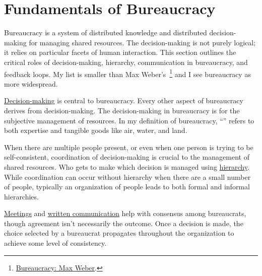 \section{Fundamentals of Bureaucracy\label{sec:fundamentals-of-b}}
  
Bureaucracy is a system of distributed knowledge and distributed decision-making for managing shared resources. The decision-making is not purely logical; it relies on particular facets of human interaction. This section outlines the critical roles of decision-making, hierarchy, communication in bureaucracy, and feedback loops. 
My list is smaller than Max Weber's~\cite{2015_Weber}\footnote{\href{https://en.wikipedia.org/wiki/Bureaucracy\#Max_Weber}{Bureaucracy: Max Weber}.
} and I see bureaucracy as more widespread.

\hyperref[sec:decision-making]{Decision-making}
is central to bureaucracy. Every other aspect of bureaucracy derives from decision-making. The decision-making in bureaucracy is for the subjective management of resources. In my definition of bureaucracy, ``\iftoggle{glossarysubstitutionworks}{\glspl{shared resource}}{shared resources}'' 
\iftoggle{glossaryinmargin}{\marginpar{[Glossary]}}{} refers to both expertise and tangible goods like air, water, and land. 

When there are multiple people present, or even when one person is trying to be self-consistent, coordination of decision-making is crucial to the management of shared resources. Who gets to make which decision is managed using
\hyperref[sec:hierarchy-of-roles]{hierarchy}.
While coordination can occur without hierarchy when there are a small number of people, typically an organization of people leads to both formal and informal hierarchies. 

\hyperref[sec:meetings-for-coordination]{Meetings} and 
\hyperref[sec:written-communication]{written communication} help with consensus among bureaucrats, though agreement isn't necessarily the outcome.
Once a decision is made, the choice selected by a bureaucrat propagates throughout the organization to achieve some level of consistency. 


